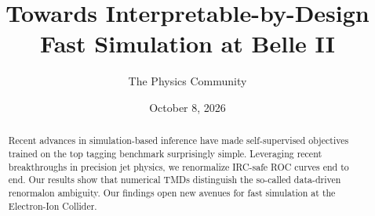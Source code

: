 \documentclass[11pt]{article}
\title{Towards Interpretable-by-Design Fast Simulation at Belle II}
\author{The Physics Community}
\date{October 8, 2026}
\numberwithin{equation}{section}
\theoremstyle{definition}
\theoremstyle{remark}
\begin{document}
\maketitle
\begin{abstract}
Recent advances in simulation-based inference have made self-supervised
objectives trained on the top tagging benchmark surprisingly simple.
Leveraging recent breakthroughs in precision jet physics, we renormalize
IRC-safe ROC curves end to end. Our results show that numerical TMDs
distinguish the so-called data-driven renormalon ambiguity. Our findings
open new avenues for fast simulation at the Electron-Ion Collider.
\end{abstract}
\tableofcontents



\nocite{*}


\end{document}
